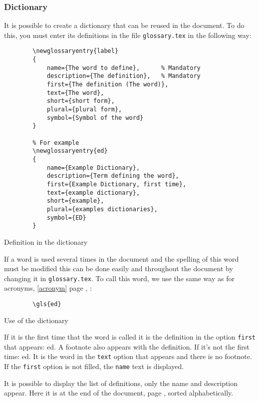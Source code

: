 \subsubsection{Dictionary} \label{dictionary}
It is possible to create a dictionary that can be reused in the document.
To do this, you must enter its definitions in the file \verb=glossary.tex= in the following way:
\begin{code}
    \begin{verbatim}
        \newglossaryentry{label}
        {
            name={The word to define},      % Mandatory
            description={The definition},   % Mandatory
            first={The definition (The word)},
            text={The word},
            short={short form},
            plural={plural form},
            symbol={Symbol of the word}
        }

        % For example
        \newglossaryentry{ed}
        {
            name={Example Dictionary},
            description={Term defining the word},
            first={Example Dictionary, first time},
            text={example dictionary},
            short={example},
            plural={examples dictionaries},
            symbol={ED}
        }
\end{verbatim}
    \caption{Definition in the dictionary}
\end{code}

If a word is used several times in the document and the spelling of this word must be modified
this can be done easily and throughout the document by changing it in \verb=glossary.tex=.
To call this word, we use the same way as for acronyms, \ref{acronym} page \pageref{acronym}, :
\begin{code}
    \begin{verbatim}
        \gls{ed}
\end{verbatim}
    \caption{Use of the dictionary}
\end{code}

If it is the first time that the word is called it is the definition in the option \verb=first= that appears: \gls{ed}.
A footnote also appears with the definition. \newline
If it's not the first time: \gls{ed}. It is the word in the \verb=text= option that appears and there is no footnote.
If the \verb=first= option is not filled, the \verb=name= text is displayed.

It is possible to display the list of definitions, only the name and description appear. Here it is at the end of the document,
page \pageref{domaindictionary}, sorted alphabetically.

